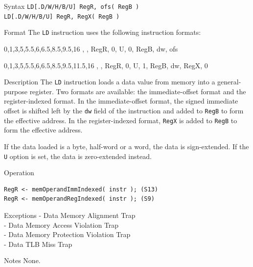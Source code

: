 %
%
\pagebreak
{}

\begin{iPageDescEntry}{Syntax}
    \texttt{LD[.D/W/H/B/U] RegR, ofs( RegB )} \\
    \texttt{LD[.D/W/H/B/U] RegR, RegX( RegB )}
\end{iPageDescEntry}

\begin{iPageDescEntry}{Format}
    The \texttt{LD} instruction uses the following instruction formats: \\

    \begin{flushleft}
    \drawInstrFormat
        {0,1,3,5,5.5,6,6.5,8.5,9.5,16}
        {\OpCodeGrpMEM, \OpCodeLD, RegR, 0, U, 0, RegB, dw, ofs}
    \end{flushleft}

    \begin{flushleft}
    \drawInstrFormat
        {0,1,3,5,5.5,6,6.5,8.5,9.5,11.5,16}
        {\OpCodeGrpMEM, \OpCodeLD, RegR, 0, U, 1, RegB, dw, RegX, 0}
    \end{flushleft}
\end{iPageDescEntry}

\begin{iPageDescEntry}{Description}
    The \texttt{LD} instruction loads a data value from memory into a general-purpose register. Two formats are available: the immediate-offset format and the register-indexed format. In the immediate-offset format, the signed immediate offset is shifted left by the \texttt{dw} field of the instruction and added to \texttt{RegB} to form the effective address. In the register-indexed format, \texttt{RegX} is added to \texttt{RegB} to form the effective address.
    
    If the data loaded is a byte, half-word or a word, the data is sign-extended. If the \texttt{U} option is set, the data is zero-extended instead.
    
\end{iPageDescEntry}

\begin{iPageDescEntry}{Operation}
\begin{lstlisting}[style=iPageOpStyle]
RegR <- memOperandImmIndexed( instr ); (S13)
RegR <- memOperandRegIndexed( instr ); (S9)
\end{lstlisting}
\end{iPageDescEntry}

\begin{iPageDescEntry}{Exceptions}
    - Data Memory Alignment Trap \\
    - Data Memory Access Violation Trap \\
    - Data Memory Protection Violation Trap \\
    - Data TLB Miss Trap
\end{iPageDescEntry}

\begin{iPageDescEntry}{Notes}
    None.
\end{iPageDescEntry}




